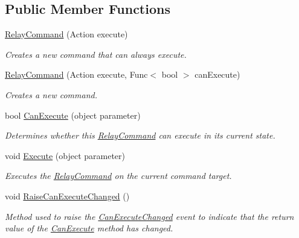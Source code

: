 \subsection*{Public Member Functions}
\begin{DoxyCompactItemize}
\item 
\hyperlink{class_helper_classes_1_1_relay_command_adaa15c8188e458580150467e65570ae3}{Relay\+Command} (Action execute)
\begin{DoxyCompactList}\small\item\em Creates a new command that can always execute. \end{DoxyCompactList}\item 
\hyperlink{class_helper_classes_1_1_relay_command_af502adcf702c1b82d7d152367ffd1841}{Relay\+Command} (Action execute, Func$<$ bool $>$ can\+Execute)
\begin{DoxyCompactList}\small\item\em Creates a new command. \end{DoxyCompactList}\item 
bool \hyperlink{class_helper_classes_1_1_relay_command_a1e2d080059a2f0f7cd455af612d77bbe}{Can\+Execute} (object parameter)
\begin{DoxyCompactList}\small\item\em Determines whether this \hyperlink{class_helper_classes_1_1_relay_command}{Relay\+Command} can execute in its current state. \end{DoxyCompactList}\item 
void \hyperlink{class_helper_classes_1_1_relay_command_aea3b6adf254deec1cb6ef1652070444b}{Execute} (object parameter)
\begin{DoxyCompactList}\small\item\em Executes the \hyperlink{class_helper_classes_1_1_relay_command}{Relay\+Command} on the current command target. \end{DoxyCompactList}\item 
void \hyperlink{class_helper_classes_1_1_relay_command_a14af980403ef90c4ee57f1395988fa8e}{Raise\+Can\+Execute\+Changed} ()
\begin{DoxyCompactList}\small\item\em Method used to raise the \hyperlink{class_helper_classes_1_1_relay_command_a2e0f01d199cf4ba351ba10aa7c9c85c4}{Can\+Execute\+Changed} event to indicate that the return value of the \hyperlink{class_helper_classes_1_1_relay_command_a1e2d080059a2f0f7cd455af612d77bbe}{Can\+Execute} method has changed. \end{DoxyCompactList}\end{DoxyCompactItemize}
